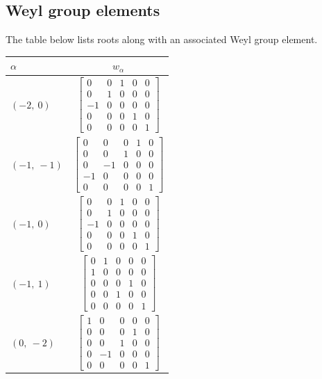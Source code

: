 \documentclass[11pt]{article}
\newcommand{\noi}{\noindent}
\theoremstyle{definition}
\begin{document}
\subsection{Weyl group elements}

\noi The table below lists roots along with an associated Weyl group element.

\bigskip

\noi \noindent \begin{longtable}{|l|c|}
    \hline
    $\alpha$ & $w_\alpha$ \\
    \hline
    \endhead
    $\left( -2, \  0\right)$ & ${\left[\begin{matrix}0 & 0 & 1 & 0 & 0\\0 & 1 & 0 & 0 & 0\\-1 & 0 & 0 & 0 & 0\\0 & 0 & 0 & 1 & 0\\0 & 0 & 0 & 0 & 1\end{matrix}\right]}$ \\
    \hline
    $\left( -1, \  -1\right)$ & ${\left[\begin{matrix}0 & 0 & 0 & 1 & 0\\0 & 0 & 1 & 0 & 0\\0 & -1 & 0 & 0 & 0\\-1 & 0 & 0 & 0 & 0\\0 & 0 & 0 & 0 & 1\end{matrix}\right]}$ \\
    \hline
    $\left( -1, \  0\right)$ & ${\left[\begin{matrix}0 & 0 & 1 & 0 & 0\\0 & 1 & 0 & 0 & 0\\-1 & 0 & 0 & 0 & 0\\0 & 0 & 0 & 1 & 0\\0 & 0 & 0 & 0 & 1\end{matrix}\right]}$ \\
    \hline
    $\left( -1, \  1\right)$ & ${\left[\begin{matrix}0 & 1 & 0 & 0 & 0\\1 & 0 & 0 & 0 & 0\\0 & 0 & 0 & 1 & 0\\0 & 0 & 1 & 0 & 0\\0 & 0 & 0 & 0 & 1\end{matrix}\right]}$ \\
    \hline
    $\left( 0, \  -2\right)$ & ${\left[\begin{matrix}1 & 0 & 0 & 0 & 0\\0 & 0 & 0 & 1 & 0\\0 & 0 & 1 & 0 & 0\\0 & -1 & 0 & 0 & 0\\0 & 0 & 0 & 0 & 1\end{matrix}\right]}$ \\

\end{longtable}
\end{document}
